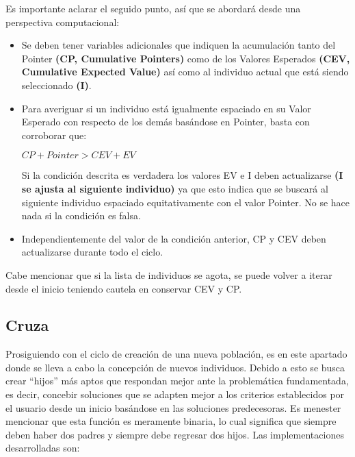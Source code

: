\documentclass[class=report, crop=false]{standalone}
\begin{document}
Es importante aclarar el seguido punto, así que se abordará desde 
una perspectiva computacional:

\begin{itemize}
\item Se deben tener variables adicionales que indiquen la 
acumulación tanto del Pointer \textbf{(CP, Cumulative Pointers)} 
como de los Valores Esperados \textbf{(CEV, Cumulative Expected Value)} 
así como al individuo actual que está siendo seleccionado \textbf{(I)}.
\item Para averiguar si un individuo está igualmente espaciado en 
su Valor Esperado con respecto de los demás basándose en Pointer, 
basta con corroborar que:\medskip\break
\centerline{$CP + Pointer > CEV + EV$}\medskip\break
Si la condición descrita es verdadera los valores EV e I deben 
actualizarse \textbf{(I se ajusta al siguiente individuo)} ya 
que esto indica que se buscará al siguiente individuo espaciado 
equitativamente con el valor Pointer. No se hace nada si la 
condición es falsa.
\item Independientemente del valor de la condición anterior, CP 
y CEV deben actualizarse durante todo el ciclo.
\end{itemize}
Cabe mencionar que si la lista de individuos se agota, se puede 
volver a iterar desde el inicio teniendo cautela en conservar CEV 
y CP.




\subsection{Cruza}
\label{sec:c2_5}
Prosiguiendo con el ciclo de creación de una nueva población, 
es en este apartado donde se lleva a cabo la concepción de nuevos 
individuos.\break
Debido a esto se busca crear ``hijos'' más aptos que respondan 
mejor ante la problemática fundamentada, es decir, concebir 
soluciones que se adapten mejor a los criterios establecidos 
por el usuario desde un inicio basándose en las soluciones 
predecesoras.\break
Es menester mencionar que esta función es meramente binaria, 
lo cual significa que siempre deben haber dos padres y siempre 
debe regresar dos hijos.\medskip\break
Las implementaciones desarrolladas son:

\end{document}
